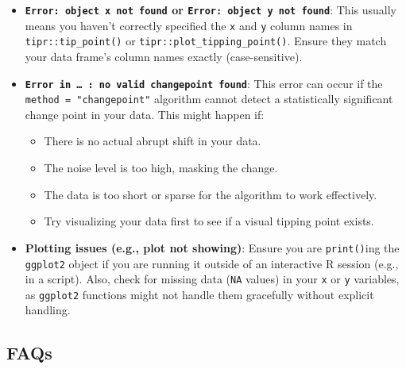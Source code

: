 \documentclass[
  10pt,
  letterpaper,
  DIV=11,
  numbers=noendperiod]{scrartcl}
\providecommand{\tightlist}{%
  \setlength{\itemsep}{0pt}\setlength{\parskip}{0pt}}
\begin{document}
\begin{itemize}
\tightlist
\item
  \textbf{\texttt{Error:\ object\ \textquotesingle{}x\textquotesingle{}\ not\ found}
  or
  \texttt{Error:\ object\ \textquotesingle{}y\textquotesingle{}\ not\ found}}:
  This usually means you haven't correctly specified the \texttt{x} and
  \texttt{y} column names in \texttt{tipr::tip\_point()} or
  \texttt{tipr::plot\_tipping\_point()}. Ensure they match your data
  frame's column names exactly (case-sensitive).
\item
  \textbf{\texttt{Error\ in\ …\ :\ no\ valid\ changepoint\ found}}: This
  error can occur if the \texttt{method\ =\ "changepoint"} algorithm
  cannot detect a statistically significant change point in your data.
  This might happen if:

  \begin{itemize}
  \tightlist
  \item
    There is no actual abrupt shift in your data.
  \item
    The noise level is too high, masking the change.
  \item
    The data is too short or sparse for the algorithm to work
    effectively.
  \item
    Try visualizing your data first to see if a visual tipping point
    exists.
  \end{itemize}
\item
  \textbf{Plotting issues (e.g., plot not showing)}: Ensure you are
  \texttt{print()}ing the \texttt{ggplot2} object if you are running it
  outside of an interactive R session (e.g., in a script). Also, check
  for missing data (\texttt{NA} values) in your \texttt{x} or \texttt{y}
  variables, as \texttt{ggplot2} functions might not handle them
  gracefully without explicit handling.
\end{itemize}

\subsection{FAQs}\label{faqs}
\end{document}
